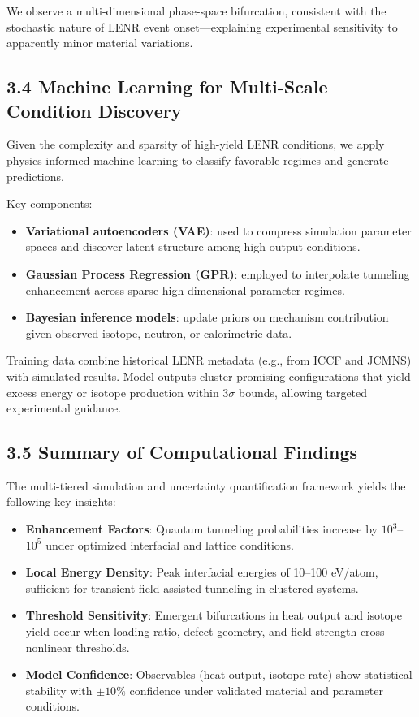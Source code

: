     We observe a multi-dimensional phase-space bifurcation, consistent with the stochastic nature of LENR event onset—explaining experimental sensitivity to apparently minor material variations.
    
    \subsection{3.4 Machine Learning for Multi-Scale Condition Discovery}
    
    Given the complexity and sparsity of high-yield LENR conditions, we apply physics-informed machine learning to classify favorable regimes and generate predictions.
    
    Key components:
    
    \begin{itemize}
        \item \textbf{Variational autoencoders (VAE)}: used to compress simulation parameter spaces and discover latent structure among high-output conditions.
        \item \textbf{Gaussian Process Regression (GPR)}: employed to interpolate tunneling enhancement across sparse high-dimensional parameter regimes.
        \item \textbf{Bayesian inference models}: update priors on mechanism contribution given observed isotope, neutron, or calorimetric data.
    \end{itemize}
    
    Training data combine historical LENR metadata (e.g., from ICCF and JCMNS) with simulated results. Model outputs cluster promising configurations that yield excess energy or isotope production within $3\sigma$ bounds, allowing targeted experimental guidance.
    
    \subsection{3.5 Summary of Computational Findings}
    
    The multi-tiered simulation and uncertainty quantification framework yields the following key insights:
    
    \begin{itemize}
        \item \textbf{Enhancement Factors}: Quantum tunneling probabilities increase by $10^3$–$10^5$ under optimized interfacial and lattice conditions.
        \item \textbf{Local Energy Density}: Peak interfacial energies of 10–100 eV/atom, sufficient for transient field-assisted tunneling in clustered systems.
        \item \textbf{Threshold Sensitivity}: Emergent bifurcations in heat output and isotope yield occur when loading ratio, defect geometry, and field strength cross nonlinear thresholds.
        \item \textbf{Model Confidence}: Observables (heat output, isotope rate) show statistical stability with $\pm 10\%$ confidence under validated material and parameter conditions.
    \end{itemize}
    

